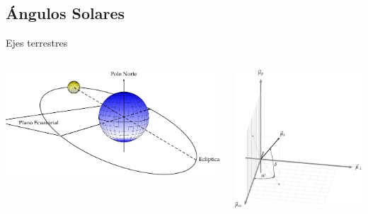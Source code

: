 \documentclass[xcolor={usenames,svgnames,dvipsnames}]{beamer}
\begin{document}
\subsection{Ángulos Solares}
\label{sec:org436d7fb}

\begin{frame}[plain,label={sec:org6a57c29}]{Ejes terrestres}
\begin{columns}
\begin{column}{0.6\columnwidth}
\begin{center}
\includegraphics[width=.9\linewidth]{../figs/SoldesdeTierra.pdf}
\end{center}
\end{column}

\begin{column}{0.6\columnwidth}
\begin{center}
\includegraphics[width=.9\linewidth]{../figs/SistemaCoordenadasTerrestre-crop.pdf}
\end{center}
\end{column}
\end{columns}


\end{frame}
\end{document}
